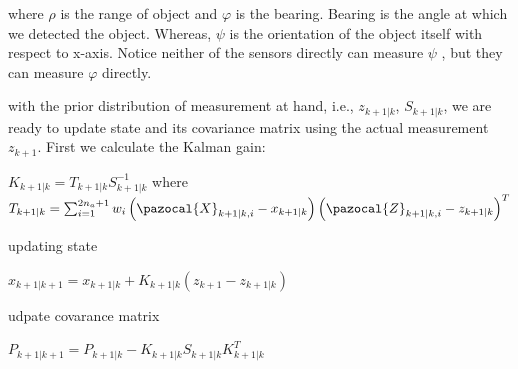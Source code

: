 \documentclass[a4paper,12pt]{article}
\begin{document}
where $\rho$ is the range of object and $\varphi$ is the bearing. Bearing is the angle at which we detected the object. Whereas, $\psi$ is the orientation of the object itself with respect to x-axis. Notice neither of the sensors directly can measure $\psi$ , but they can measure $\varphi$ directly. 

with the prior distribution of measurement at hand, i.e., $z_{k+1|k}$, $S_{k+1|k}$, we are ready to update state and its covariance matrix using the actual measurement $z_{k+1}$. First we calculate the Kalman gain:

$K_{k+1|k} = T_{k+1|k}S^{-1}_{k+1|k}$
where
$T_{k+1|k} = \sum_{i=1}^{2n_a+1}w_i\left(\pazocal{X}_{k+1|k,i}-x_{k+1|k}\right)\left(\pazocal{Z}_{k+1|k,i}-z_{k+1|k}\right)^{T} $

updating state 

$x_{k+1|k+1} = x_{k+1|k} + K_{k+1|k}(z_{k+1} - z_{k+1|k})$

udpate covarance matrix 

$P_{k+1|k+1} = P_{k+1|k} - K_{k+1|k}S_{k+1|k}K^T_{k+1|k}$
\end{document}

